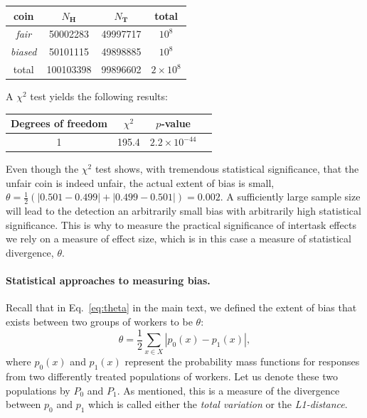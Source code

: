 \documentclass[12pt]{article}
\begin{document}
\begin{center}
\begin{tabular}{c c c c}
\toprule
coin & $N_\mathbf{H}$ & $N_{\mathbf{T}}$ & total \\
\toprule
\textit{fair} & 50002283 & 49997717 & $10^8$\\
\textit{biased} & 50101115 & 49898885 & $10^8$ \\
\bottomrule
total & 100103398 & 99896602 & $2\times 10^8$ \\
\bottomrule
\end{tabular}
\end{center}
A $\chi^2$ test yields the following results:
\begin{center}
	\begin{tabular}{c c c c }
	\toprule
	Degrees of freedom & $\chi^2$ & $p$-value \\
	\toprule
	1 & 195.4 & $2.2 \times 10^{-44}$ \\
	\bottomrule
	\end{tabular}
\end{center}
Even though the $\chi^2$ test shows, with tremendous statistical 
significance, that the unfair coin is indeed unfair, the actual extent
of bias is small, 
$\theta = \frac{1}{2}\left( |0.501 - 0.499| + |0.499 - 0.501| \right) = 0.002$.
A sufficiently large sample size will lead to the detection an arbitrarily 
small bias with arbitrarily high statistical significance.
This is why to measure the practical significance of intertask effects
we rely on a measure of effect size, which is in this case a measure
of statistical divergence, $\theta$.



\paragraph{Statistical approaches to measuring bias.}
Recall that in Eq.~\ref{eq:theta} in the main text, we defined the
extent of bias that exists between two groups of workers to be $\theta$:
$$
	\theta = \frac{1}{2}\sum_{x \in X} \left| p_0(x) - p_1(x) \right|,
$$
where $p_0(x)$ and $p_1(x)$ represent the probability mass functions
for responses from two differently treated populations of workers.  
Let us denote these two populations by $P_0$ and $P_1$.
As mentioned, this is a measure of the divergence between $p_0$ and $p_1$ 
which is called either the \textit{total variation} or the 
\textit{L1-distance}.
\end{document}
